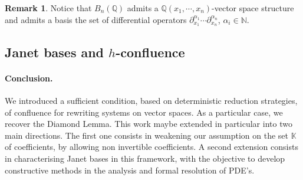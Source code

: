\documentclass[10pt]{easychair}
\theoremstyle{definition}
\newtheorem{remark}[theorem]{Remark}
\newcommand\K{\mathbb{K}}
\newcommand\Q{\mathbb{Q}}
\newcommand\N{\mathbb{N}}
\newcommand\QX{\mathbb{Q}(x_1,\cdots,x_n)}
\newcommand\diff[1]{\partial_{x_{#1}}}
\begin{document}
\begin{remark}
  Notice that $B_n(\Q)$ admits a $\QX$-vector space structure and admits
  a basis the set of differential operators
  $\diff{1}^{\alpha_1}\cdots\diff{n}^{\alpha_n}$, $\alpha_i\in\N$.
\end{remark}

\subsection{Janet bases and $h$-confluence}

\paragraph{Conclusion.} We introduced a sufficient condition, based on deterministic reduction strategies, of confluence for rewriting systems on vector spaces. As a particular case, we recover the Diamond Lemma. This work maybe extended in particular into two main directions. The first one consists in weakening our assumption on the set $\K$ of coefficients, by allowing non invertible coefficients. A second extension consists in characterising Janet bases in this framework, with the objective to develop constructive methods in the analysis and formal resolution of PDE's.


\end{document}
